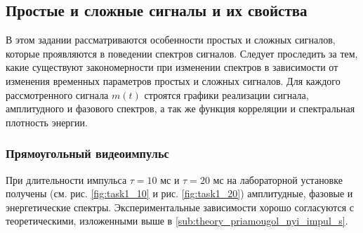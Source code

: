 \subsection{Простые и сложные сигналы и их свойства}
В этом задании рассматриваются особенности простых и сложных
сигналов, которые проявляются в поведении спектров сигналов. Следует
проследить за тем, какие существуют закономерности при изменении спектров
в зависимости от изменения временных параметров простых и сложных
сигналов.
Для каждого рассмотренного сигнала $m(t)$ строятся графики реализации
сигнала, амплитудного и фазового спектров, а так же функция корреляции и
спектральная плотность энергии.



\subsubsection{Прямоугольный видеоимпульс}

При длительности импульса $\tau= 10$ мс и  $\tau=20$ мс на лабораторной
установке получены (см. рис. \ref{fig:task1_10} и рис.
\ref{fig:task1_20}) амплитудные, фазовые и энергетические спектры.
Экспериментальные зависимости хорошо согласуются с теоретическими, изложенными
выше в \ref{sub:theory_priamougol_nyi_impul_s}.


